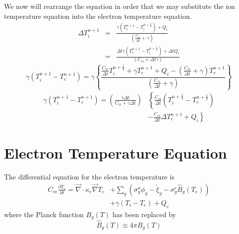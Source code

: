 \documentclass{article}
\newcommand{\partl}[2]{\ensuremath{\frac{\partial{#1}}{\partial{#2}}}}\newcommand{\del}{\ensuremath{\vec{\nabla}}}
\newcommand{\dt}{\ensuremath{\Delta t}}
\newcommand{\cviOdt}{\ensuremath{\frac{C_{vi}}{\dt}}}
\newcommand{\Bg}{\ensuremath{\hat{B}_{g}}}
\begin{document}
We now will rearrange the equation in order that we may substitute the
ion temperature equation into the electron temperature equation.
\begin{eqnarray}
        \Delta T_{i}^{n+1} &=& \frac{ \gamma ( T_{e}^{n+1} - T_{i}^{n+\frac{1}{2}} )
                                + Q_{i} }{(\cviOdt + \gamma)} 
                \\
                           &=& \frac{ \dt \gamma
                                         ( T_{e}^{n+1} - T_{i}^{n+\frac{1}{2}} )
                                + \dt Q_{i} }{(C_{vi} + \dt \gamma)}
\end{eqnarray}
\begin{equation}
        \gamma (T_{i}^{n+1}-T_{e}^{n+1}) =
                \gamma \left\{ \frac{\cviOdt T_{i}^{n+\frac{1}{2}} + \gamma T_{e}^{n+1}
                                + Q_{i} - (\cviOdt + \gamma) T_{e}^{n+1}}
                                {(\cviOdt + \gamma)} \right\}
\end{equation}
\begin{equation}
   \boxed{
   \begin{split}
        \gamma (T_{i}^{n+1}-T_{e}^{n+1}) =
                \left(\frac{\gamma\dt}{C_{vi} + \gamma \dt} \right)
                &  \left\{\cviOdt(T_{i}^{n+\frac{1}{2}} - T_{e}^{n+\frac{1}{2}}) \right.
        \\
                & \left.
                        - \cviOdt \Delta T_{e}^{n+1}
                        + Q_{i} \right\}
   \end{split}
   }
\label{eq:Ti}
\end{equation}

\section{Electron Temperature Equation}

The differential equation for the electron temperature is
\begin{equation}
  \begin{split}
        C_{ve} \partl{T_{e}}{t} = 
                \del \cdot \kappa_{e} \del T_{e} & +
                \sum_{g} \left(
                        \sigma_{g}^{a} \phi_{g} - \tilde{\xi}_{g}
                        - \sigma_{g}^{e} \Bg(T_{e}) \right) \\
                        & + \gamma (T_{i} - T_{e}) + Q_{e}
  \end{split}
\end{equation}
where the Planck function $B_{g}(T)$ has been replaced by
\begin{equation}
        \Bg(T) \equiv 4\pi B_{g}(T)
\end{equation}
\end{document}
